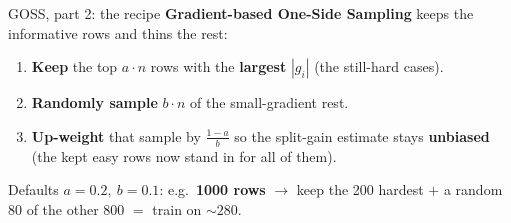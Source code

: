 \documentclass[aspectratio=169]{beamer}
\begin{document}
\begin{frame}{GOSS, part 2: the recipe}
  \textbf{Gradient-based One-Side Sampling} keeps the informative rows and thins the rest:
  \begin{enumerate}\small
    \item \textbf{Keep} the top $a\!\cdot\!n$ rows with the \textbf{largest} $|g_i|$ (the
      still-hard cases).
    \item \textbf{Randomly sample} $b\!\cdot\!n$ of the small-gradient rest.
    \item \textbf{Up-weight} that sample by $\tfrac{1-a}{b}$ so the split-gain estimate stays
      \textbf{unbiased} (the kept easy rows now stand in for all of them).
  \end{enumerate}
  \vskip 2pt
  {\small Defaults $a = 0.2,\ b = 0.1$: e.g.\ \textbf{1000 rows} $\to$ keep the 200 hardest
  $+$ a random 80 of the other 800 $=$ train on ${\sim}280$.}
  \vfill
\end{frame}
\end{document}
